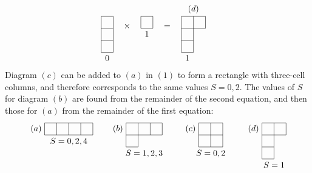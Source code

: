 {\begin{equation*}
\begin{split}
\begin{tikzpicture}[baseline,scale=0.5]
\draw (0,-2)--(0,1);
\draw (1,-2)--(1,1);
\draw (0,-2)--(1,-2);
\draw (0,-1)--(1,-1);
\draw (0,0)--(1,0);
\draw (0,1)--(1,1);
\node[below] at (0.5,-2) {$ 0 $};
\end{tikzpicture}\quad\times\quad\begin{tikzpicture}[baseline,scale=0.5]
\draw (0,0)--(1,0);
\draw (0,0)--(0,1);
\draw (1,0)--(1,1);
\draw (0,1)--(1,1);
\node[below] at (0.5,0) {$ 1 $};
\end{tikzpicture}\quad&=\quad\begin{tikzpicture}[baseline,scale=0.5]
\draw (0,1)--(2,1);
\draw (0,0)--(2,0);
\draw (0,-1)--(1,-1);
\draw (0,-2)--(1,-2);
\draw (0,-2)--(0,1);
\draw (1,-2)--(1,1);
\draw (2,0)--(2,1);
\node[above] at (1,1) {$ (d) $};
\node[below] at (0.5,-2) {$ 1 $};
\end{tikzpicture}
\end{split}
\end{equation*}
Diagram $ (c) $ can be added to $ (a) $ in $ (1) $ to form a rectangle with three-cell columns, and therefore corresponds to the same values $ S = 0, 2 $. The values of $ S $ for diagram $ (b) $ are found from the remainder of the second equation, and then those for $ (a) $ from the remainder of the first equation:
\[ \begin{tikzpicture}[baseline,scale=0.5]
\draw (0,0)--(4,0);
\draw (0,1)--(4,1);
\draw (0,0)--(0,1);
\draw (1,0)--(1,1);
\draw (2,0)--(2,1);
\draw (3,0)--(3,1);
\draw (4,0)--(4,1);
\node[left] at (0,0.5) {$ (a) $};
\node[below] at (2,0) {$ S=0,2,4 $};
\end{tikzpicture}\qquad\begin{tikzpicture}[baseline,scale=0.5]
\draw (0,0)--(3,0);
\draw (0,1)--(3,1);
\draw (0,-1)--(1,-1);
\draw (0,-1)--(0,1);
\draw (1,-1)--(1,1);
\draw (2,0)--(2,1);
\draw (3,0)--(3,1);
\node[left] at (0,0.5) {$ (b) $};
\node[below] at (1.5,-1) {$ S=1,2,3 $};
\end{tikzpicture}\qquad\begin{tikzpicture}[baseline,scale=0.5]
\node[left] at (0,0.5) {$ (c) $};
\draw (0,1)--(2,1);
\draw (0,0)--(2,0);
\draw (0,-1)--(2,-1);
\draw (0,-1)--(0,1);
\draw (1,-1)--(1,1);
\draw (2,-1)--(2,1);
\node[below] at (1,-1) {$ S=0,2 $};
\end{tikzpicture}\qquad\begin{tikzpicture}[baseline,scale=0.5]
\draw (0,0)--(2,0);
\draw (0,1)--(2,1);
\draw (0,-1)--(1,-1);
\draw (0,-2)--(1,-2);
\draw (0,-2)--(0,1);
\draw (1,-2)--(1,1);
\draw (2,0)--(2,1);
\node[left] at (0,0.5) {$ (d) $};
\node[below] at (1,-2) {$ S=1 $};
\end{tikzpicture} \]
}
